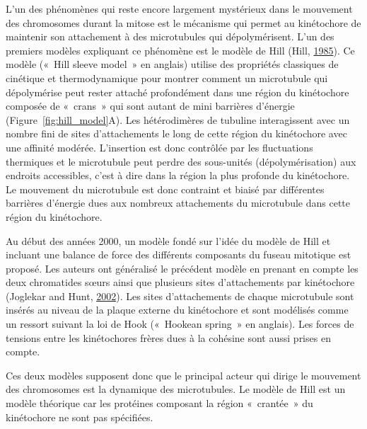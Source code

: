 \documentclass[12pt,a4paper,twoside,openright]{book}
\begin{document}
L'un des phénomènes qui reste encore largement mystérieux dans le
mouvement des chromosomes durant la mitose est le mécanisme qui permet
au kinétochore de maintenir son attachement à des microtubules qui
dépolymérisent. L'un des premiers modèles expliquant ce phénomène est le
modèle de Hill (Hill, \protect\hyperlink{ref-Hill1985}{1985}). Ce modèle
(«~Hill sleeve model~» en anglais) utilise des propriétés classiques de
cinétique et thermodynamique pour montrer comment un microtubule qui
dépolymérise peut rester attaché profondément dans une région du
kinétochore composée de «~crans~» qui sont autant de mini barrières
d'énergie (Figure~\ref{fig:hill_model}A). Les hétérodimères de tubuline
interagissent avec un nombre fini de sites d'attachements le long de
cette région du kinétochore avec une affinité modérée. L'insertion est
donc contrôlée par les fluctuations thermiques et le microtubule peut
perdre des sous-unités (dépolymérisation) aux endroits accessibles,
c'est à dire dans la région la plus profonde du kinétochore. Le
mouvement du microtubule est donc contraint et biaisé par différentes
barrières d'énergie dues aux nombreux attachements du microtubule dans
cette région du kinétochore.

Au début des années 2000, un modèle fondé sur l'idée du modèle de Hill
et incluant une balance de force des différents composants du fuseau
mitotique est proposé. Les auteurs ont généralisé le précédent modèle en
prenant en compte les deux chromatides sœurs ainsi que plusieurs sites
d'attachements par kinétochore (Joglekar and Hunt,
\protect\hyperlink{ref-Joglekar2002}{2002}). Les sites d'attachements de
chaque microtubule sont insérés au niveau de la plaque externe du
kinétochore et sont modélisés comme un ressort suivant la loi de Hook
(«~Hookean spring~» en anglais). Les forces de tensions entre les
kinétochores frères dues à la cohésine sont aussi prises en compte.

Ces deux modèles supposent donc que le principal acteur qui dirige le
mouvement des chromosomes est la dynamique des microtubules. Le modèle
de Hill est un modèle théorique car les protéines composant la région
«~crantée~» du kinétochore ne sont pas spécifiées.
\end{document}
